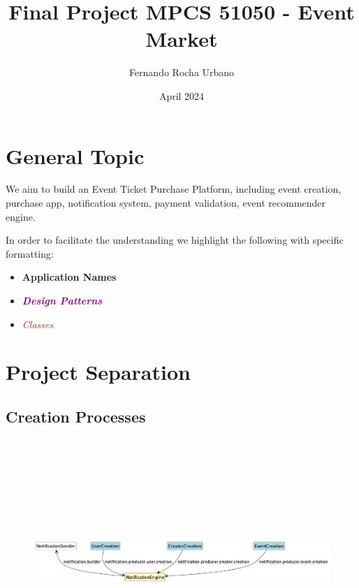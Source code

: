 \documentclass{article}
\title{Final Project MPCS 51050 - Event Market}
\author{Fernando Rocha Urbano}
\date{April 2024}
\newcommand{\designpattern}[1]{\textbf{\textit{\textcolor{purple}{#1}}}}
\newcommand{\designclass}[1]{\textit{\textcolor{brown}{#1}}}
\newcommand{\application}[1]{\textbf{\textcolor{codegreen}{#1}}}
\begin{document}
\maketitle

\FloatBarrier
\section{General Topic}
We aim to build an Event Ticket Purchase Platform, including event creation, purchase app, notification system, payment validation, event recommender engine.

In order to facilitate the understanding we highlight the following with specific formatting:
\begin{itemize}
    \item \application{Application Names}
    \item \designpattern{Design Patterns}
    \item \designclass{Classes}
\end{itemize}

\FloatBarrier
\section{Project Separation}
\FloatBarrier
\subsection{Creation Processes}
\begin{figure}[h]
    \centering
    \includegraphics[width=\textwidth, height=350px, keepaspectratio]{assets/uml/structure/Creation.png}
\end{figure}
\end{document}
